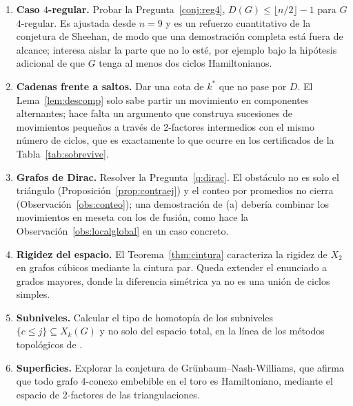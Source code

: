 \documentclass[11pt,a4paper]{article}
\theoremstyle{definition}
\theoremstyle{remark}
\begin{document}
\begin{enumerate}
\item \textbf{Caso $4$-regular.} Probar la Pregunta~\ref{conj:reg4}, $D(G)\le\lfloor n/2\rfloor-1$ para $G$ $4$-regular. Es ajustada desde $n=9$ y es un refuerzo cuantitativo de la conjetura de Sheehan, de modo que una demostración completa está fuera de alcance; interesa aislar la parte que no lo esté, por ejemplo bajo la hipótesis adicional de que $G$ tenga al menos dos ciclos Hamiltonianos.
\item \textbf{Cadenas frente a saltos.} Dar una cota de $k^*$ que no pase por $D$. El Lema~\ref{lem:descomp} solo sabe partir un movimiento en componentes alternantes; hace falta un argumento que construya sucesiones de movimientos pequeños a través de 2-factores intermedios con el mismo número de ciclos, que es exactamente lo que ocurre en los certificados de la Tabla~\ref{tab:sobrevive}.
\item \textbf{Grafos de Dirac.} Resolver la Pregunta~\ref{q:dirac}. El obstáculo no es solo el triángulo (Proposición~\ref{prop:contraej}) y el conteo por promedios no cierra (Observación~\ref{obs:conteo}); una demostración de (a) debería combinar los movimientos en meseta con los de fusión, como hace la Observación~\ref{obs:localglobal} en un caso concreto.
\item \textbf{Rigidez del espacio.} El Teorema~\ref{thm:cintura} caracteriza la rigidez de $X_2$ en grafos cúbicos mediante la cintura par. Queda extender el enunciado a grados mayores, donde la diferencia simétrica ya no es una unión de ciclos simples.
\item \textbf{Subniveles.} Calcular el tipo de homotopía de los subniveles $\{c\le j\}\subseteq X_k(G)$ y no solo del espacio total, en la línea de los métodos topológicos de \cite{aharoni,meshulam}.
\item \textbf{Superficies.} Explorar la conjetura de Grünbaum--Nash-Williams, que afirma que todo grafo $4$-conexo embebible en el toro es Hamiltoniano, mediante el espacio de 2-factores de las triangulaciones.
\end{enumerate}
\end{document}
